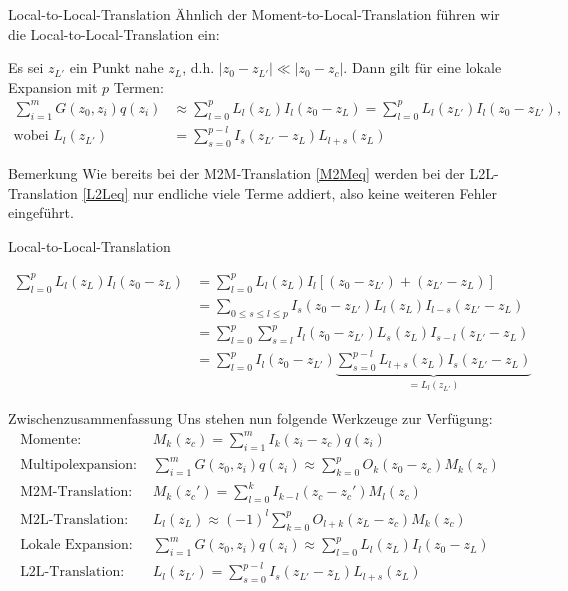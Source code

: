 \documentclass[ngerman]{beamer}
\begin{document}
\begin{frame}{Local-to-Local-Translation}
\normalsize
Ähnlich der Moment-to-Local-Translation führen wir die Local-to-Local-Translation ein:
\begin{Satz}
Es sei $z_{L'}$ ein Punkt nahe $z_L$, d.h. $|z_0-z_{L'}|\ll |z_0-z_c|$. Dann gilt für eine lokale Expansion mit $p$ Termen:
\begin{align}
\sum_{i=1}^m {G(z_0,z_i)q(z_i)} &\approx \sum_{l=0}^p L_l(z_L)I_l(z_0-z_L) = \sum_{l=0}^p L_l(z_{L'})I_l(z_0-z_{L'}),\nonumber\\
\text{wobei } L_l(z_{L'})&=\sum_{s=0}^{p-l} I_s(z_{L'}-z_L)L_{l+s}(z_L)\label{L2Leq}
\end{align}
\end{Satz}
\begin{block}{Bemerkung}
Wie bereits bei der M2M-Translation \eqref{M2Meq} werden bei der L2L-Translation \eqref{L2Leq} nur endliche viele Terme addiert, also keine weiteren Fehler eingeführt.
\end{block}
\end{frame}

\begin{frame}{Local-to-Local-Translation}
\begin{Beweis}
\begin{align*}
\sum_{l=0}^p L_l(z_L)I_l(z_0-z_L) &= \sum_{l=0}^p L_l(z_L)I_l\left[(z_0-z_{L'}) + (z_{L'}-z_L)\right]\\
&=\sum_{0\leq s\leq l \leq p} I_s(z_0-z_{L'}) L_l(z_L)I_{l-s}(z_{L'}-z_L)\\
&=\sum_{l=0}^p \sum_{s=l}^p I_l(z_0-z_{L'}) L_s(z_L)I_{s-l}(z_{L'}-z_L) \\
&=\sum_{l=0}^p I_l(z_0-z_{L'}) \underbrace{\sum_{s=0}^{p-l}  L_{l+s}(z_L)I_{s}(z_{L'}-z_L)}_{=L_l(z_{L'})}
\end{align*}
\end{Beweis}
\end{frame}

\begin{frame}{Zwischenzusammenfassung}
Uns stehen nun folgende Werkzeuge zur Verfügung:
\small
\begin{align*}
\text{Momente: }& M_k(z_c) =  \sum_{i=1}^m I_k(z_i-z_c) q(z_i)\\
\text{Multipolexpansion: }&\sum_{i=1}^m {G(z_0,z_i)q(z_i)} \approx \sum_{k=0}^p O_k(z_0-z_c)M_k(z_c)\\
\text{M2M-Translation: }& M_k(z_c') = \sum_{l=0}^k I_{k-l}(z_c-z_c')M_l(z_c)\\
\text{M2L-Translation: }&L_l(z_L)\approx(-1)^l\sum_{k=0}^p O_{l+k}(z_L-z_c)M_k(z_c) \\
\text{Lokale Expansion: }&\sum_{i=1}^m {G(z_0,z_i)q(z_i)} \approx \sum_{l=0}^p L_l(z_L)I_l(z_0-z_L)\\
\text{L2L-Translation: }&L_l(z_{L'})=\sum_{s=0}^{p-l} I_s(z_{L'}-z_L)L_{l+s}(z_L)
\end{align*}
\end{frame}


\end{document}

